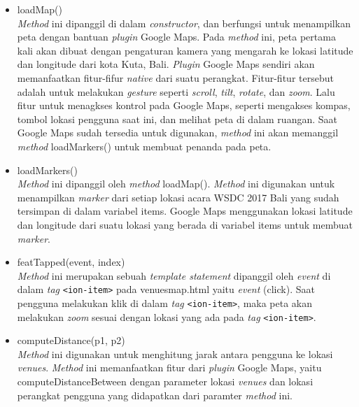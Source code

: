 \begin{enumerate}
\begin{itemize}
		\item loadMap() \\
		\textit{Method} ini dipanggil di dalam \textit{constructor}, dan berfungsi untuk menampilkan peta dengan bantuan \textit{plugin} Google Maps. Pada \textit{method} ini, peta pertama kali akan dibuat dengan pengaturan kamera yang mengarah ke lokasi latitude dan longitude dari kota Kuta, Bali. 	
		\textit{Plugin} Google Maps sendiri akan memanfaatkan fitur-fifur \textit{native} dari suatu perangkat. Fitur-fitur tersebut adalah untuk melakukan \textit{gesture} seperti \textit{scroll}, \textit{tilt}, \textit{rotate}, dan \textit{zoom}. Lalu fitur untuk menagkses kontrol pada Google Maps, seperti mengakses kompas, tombol lokasi pengguna saat ini, dan melihat peta di dalam ruangan. Saat Google Maps sudah tersedia untuk digunakan, \textit{method} ini akan memanggil \textit{method} loadMarkers() untuk membuat penanda pada peta.	
		\item loadMarkers() \\
		\textit{Method} ini dipanggil oleh \textit{method} loadMap(). \textit{Method} ini digunakan untuk menampilkan \textit{marker} dari setiap lokasi acara WSDC 2017 Bali yang sudah tersimpan di dalam variabel items. Google Maps menggunakan lokasi latitude dan longitude dari suatu lokasi yang berada di variabel items untuk membuat \textit{marker}.  
		\item featTapped(event, index) \\
		\textit{Method} ini merupakan sebuah \textit{template statement} dipanggil oleh \textit{event} di dalam \textit{tag} \texttt{<ion-item>} pada venues\textunderscore map.html yaitu \textit{event} (click). Saat pengguna melakukan klik di dalam \textit{tag} \texttt{<ion-item>}, maka peta akan melakukan \textit{zoom} sesuai dengan lokasi yang ada pada \textit{tag} \texttt{<ion-item>}.
		\item computeDistance(p1, p2)\\
		\textit{Method} ini digunakan untuk menghitung jarak antara pengguna ke lokasi \textit{venues}. \textit{Method} ini memanfaatkan fitur dari \textit{plugin} Google Maps, yaitu computeDistanceBetween dengan parameter lokasi \textit{venues} dan lokasi perangkat pengguna yang didapatkan dari paramter \textit{method} ini.
	\end{itemize}
	

\end{enumerate}
